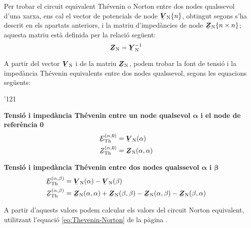 Per trobar
el circuit equivalent Th\'{e}venin o Norton entre dos nodes qualssevol
d'una xarxa, ens cal el vector de potencials de node
$\mcmplx{V}\ped{N}\{n\}$, obtingut segons s'ha descrit en els
apartats anteriors, i la matriu d'imped\`{a}ncies de node
$\mcmplx{Z}\ped{N}\{n\times n\}$; aquesta matriu est\`{a} definida per
la relaci\'{o} seg\"{u}ent:
\begin{equation}
   \mcmplx{Z}\ped{N} = \mcmplx{Y}\ped{N}^{-1}
\end{equation}

A partir del vector $\mcmplx{V}\ped{N}$ i de la matriu
$\mcmplx{Z}\ped{N}$, podem trobar la font de tensi\'{o} i la imped\`{a}ncia
Th\'{e}venin equivalents entre dos nodes qualssevol, segons les
equacions seg\"{u}ents:

\begin{dinglist}{'121}
   \item \textbf{Tensi\'{o} i imped\`{a}ncia Th\'{e}venin entre un node qualsevol
                 ${\boldsymbol\alpha}$ i el node de refer\`{e}ncia 0}
   \begin{align}
      \cmplx{E}\ped{Th}^{(\alpha,0)} &= \mcmplx{V}\ped{N}(\alpha) \\
      \cmplx{Z}\ped{Th}^{(\alpha,0)} &= \mcmplx{Z}\ped{N}(\alpha,\alpha)
   \end{align}

   \item \textbf{Tensi\'{o} i imped\`{a}ncia Th\'{e}venin entre dos nodes qualssevol
                 ${\boldsymbol\alpha}$ i ${\boldsymbol\beta}$}
   \begin{align}
      \cmplx{E}\ped{Th}^{(\alpha,\beta)} &= \mcmplx{V}\ped{N}(\alpha) - \mcmplx{V}\ped{N}(\beta) \\
      \cmplx{Z}\ped{Th}^{(\alpha,\beta)} &= \mcmplx{Z}\ped{N}(\alpha,\alpha) +
      \mcmplx{Z}\ped{N}(\beta,\beta) - \mcmplx{Z}\ped{N}(\alpha,\beta) -
       \mcmplx{Z}\ped{N}(\beta,\alpha)
   \end{align}
\end{dinglist}

A partir d'aquests valors podem calcular els valors del circuit Norton equivalent, utilitzant l'equaci\'{o} \eqref{eq:Thevenin-Norton} de la p\`{a}gina \pageref{eq:Thevenin-Norton}.

